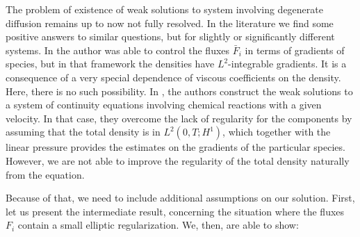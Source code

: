 \documentclass[11pt]{article}
\newtheorem*{quest}{Question}
\numberwithin{equation}{section}
\numberwithin{tw}{section}
\begin{document}

The problem of existence of weak solutions to system involving degenerate diffusion remains up to now not fully resolved.
In the literature we find some positive answers to similar questions, but for slightly or significantly different systems. In \cite{Za_1,zatorska2013}
the author was able to control the fluxes $\bar F_i$ in terms of gradients of species, but in that framework 
the densities have $L^2$-integrable gradients. It is a consequence of a very special dependence of viscous coefficients on the density. Here, there is no such possibility. In \cite{degenerate-parabolic}, the authors construct the weak solutions to a system of continuity equations involving chemical reactions with a given velocity. In that case, they overcome the lack of regularity for the components by assuming that the total density is in $L^2(0,T;H^1)$, which together with the linear pressure provides the estimates on the gradients of the particular species. However, we are not able to improve the regularity of the total density naturally from the equation.



Because of that, we need to include additional assumptions on our solution. First, let us present the intermediate result, concerning the situation where the fluxes $F_i$ contain a small  elliptic regularization. We, then, are able to show:
\end{document}
